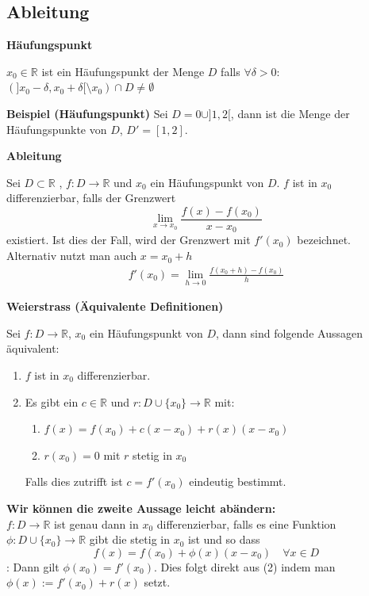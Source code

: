 \documentclass[25pt]{sciposter}
\newcommand{\R}{\mathbb{R}}
\newenvironment{method}[1]{\begin{mdframed}[backgroundcolor=blue!10,innertopmargin=15pt, innerbottommargin=15pt, nobreak=true]
		\textbf{#1 }
	}
	{ 
	\end{mdframed}
}
\begin{document}
\begin{multicols}{3}
\section{Ableitung}

\begin{method}{Häufungspunkt} 
	$x_0 \in \R$ ist ein Häufungspunkt der Menge $D$ falls $\forall \delta > 0$:
	$(]x_0 - \delta, x_0 + \delta [ \setminus x_0) \cap D \not = \emptyset$
\end{method}
\textbf{Beispiel (Häufungspunkt)} Sei $D = {0} \cup ] 1,2 [$, dann ist die Menge der Häufungspunkte von $D$, $D' = [1,2]$.


\begin{method}{Ableitung}
	Sei $D \subset \R$ , $f:D \to  \R$ und $x_0$ ein Häufungspunkt von $D$. $f$ ist in $x_0$ differenzierbar, falls der Grenzwert 
	$$ \lim\limits_{x \to x_0} \frac{f(x) -f(x_0)}{x-x_0}$$
	existiert. Ist dies der Fall, wird der Grenzwert mit $f'(x_0)$ bezeichnet.\\
	Alternativ nutzt man auch $x = x_0 + h$
	\begin{align*}
			f'(x_0) = \lim\limits_{h \to 0} \frac{f(x_0 + h) - f(x_0)}{h}
	\end{align*}
\end{method}


\begin{method}{Weierstrass (Äquivalente Definitionen)}
Sei $f : D \to \R$, $x_0$ ein Häufungspunkt von $D$, dann sind folgende Aussagen äquivalent:
\begin{enumerate}
	\item $f$ ist in $x_0$ differenzierbar.
	\item Es gibt ein $c\in \R$ und $r : D \cup \{x_0\} \to \R$ mit:
	\begin{enumerate}
		\item $f(x) = f(x_0) + c(x-x_0) + r(x) (x-x_0)$
		\item $r(x_0) = 0$ mit $r$ stetig in $x_0$
	\end{enumerate}
Falls dies zutrifft ist $c=f'(x_0)$ eindeutig bestimmt.
\end{enumerate}

\textbf{Wir können die zweite Aussage leicht abändern:}\\
$f:D \to \R$ ist genau dann in $x_0$ differenzierbar, falls es eine Funktion $\phi : D \cup \{x_0\} \to \R$ gibt die stetig in $x_0$ ist und so dass 
$$f(x) = f(x_0) + \phi(x)(x-x_0) \quad \forall x \in D$$:
Dann gilt $\phi(x_0) = f'(x_0)$. Dies folgt direkt aus (2) indem man $\phi(x) := f'(x_0) + r(x)$ setzt.
\end{method}


\end{multicols}
\end{document}
